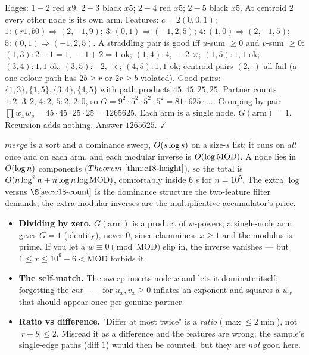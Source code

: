 \begin{tracebox}[Sample 1 by hand -- centroid \(2\), features \((u,v,w)\) with \(u=2r-b,\ v=2b-r\)]
Edges: \(1\!-\!2\) red \(x9\); \(2\!-\!3\) black \(x5\); \(2\!-\!4\) red \(x5\);
\(2\!-\!5\) black \(x5\). At centroid \(2\) every other node is its own arm. Features:
\(c=2(0,0,1)\); \(1:(r1,b0)\Rightarrow(2,-1,9)\); \(3:(0,1)\Rightarrow(-1,2,5)\);
\(4:(1,0)\Rightarrow(2,-1,5)\); \(5:(0,1)\Rightarrow(-1,2,5)\). A straddling pair is good
iff \(u\)-sum \(\ge0\) and \(v\)-sum \(\ge0\):
\((1,3):2{-}1{=}1,\ {-}1{+}2{=}1\) ok; \((1,4):4,\ {-}2\) \(\times\); \((1,5):1,1\) ok;
\((3,4):1,1\) ok; \((3,5):{-}2,\ \times\); \((4,5):1,1\) ok; centroid pairs
\((2,\cdot)\) all fail (a one-colour path has \(2b\ge r\) or \(2r\ge b\) violated). Good
pairs: \(\{1,3\},\{1,5\},\{3,4\},\{4,5\}\) with path products \(45,45,25,25\). Partner
counts \(1{:}2,\,3{:}2,\,4{:}2,\,5{:}2,\,2{:}0\), so
\(G=9^2\!\cdot5^2\!\cdot5^2\!\cdot5^2 = 81\cdot625\cdot\ldots\). Grouping by pair
\(\prod w_x w_y=45\!\cdot\!45\!\cdot\!25\!\cdot\!25=1265625\). Each arm is a single node,
\(G(\text{arm})=1\). Recursion adds nothing. Answer \(1265625\). \(\checkmark\)
\end{tracebox}

\begin{complexitybox}
\(\mathit{merge}\) is a sort and a dominance sweep, \(O(s\log s)\) on a size-\(s\)
list; it runs on \(\mathit{all}\) once and on each arm, and each modular inverse is
\(O(\log \text{MOD})\). A node lies in \(O(\log n)\) components
(\(\thmref{c18-height}\)), so the total is \(O(n\log^2 n + n\log n\log\text{MOD})\),
comfortably inside 6 s for \(n=10^5\). The extra \(\log\) versus \(\secref{c18-count}\) is
the dominance structure the two-feature filter demands; the extra modular inverses are the
multiplicative accumulator's price.
\end{complexitybox}

\begin{warningbox}
\begin{itemize}[nosep]
  \item \textbf{Dividing by zero.} \(G(\text{arm})\) is a product of \(w\)-powers; a
        single-node arm gives \(G=1\) (identity), never \(0\), since clamminess
        \(x\ge1\) and the modulus is prime. If you let a \(w\equiv0\pmod{\text{MOD}}\)
        slip in, the inverse vanishes --- but \(1\le x\le 10^9{+}6<\text{MOD}\) forbids it.
  \item \textbf{The self-match.} The sweep inserts node \(x\) and lets it dominate itself;
        forgetting the \(\mathit{cnt}--\) for \(u_x,v_x\ge0\) inflates an exponent and
        squares a \(w_x\) that should appear once per genuine partner.
  \item \textbf{Ratio vs difference.} "Differ at most twice" is a \emph{ratio}
        (\(\max\le2\min\)), not \(|r-b|\le2\). Misread it as a difference and the features
        are wrong; the sample's single-edge paths (diff \(1\)) would then be counted, but
        they are \emph{not} good here.
\end{itemize}
\end{warningbox}

